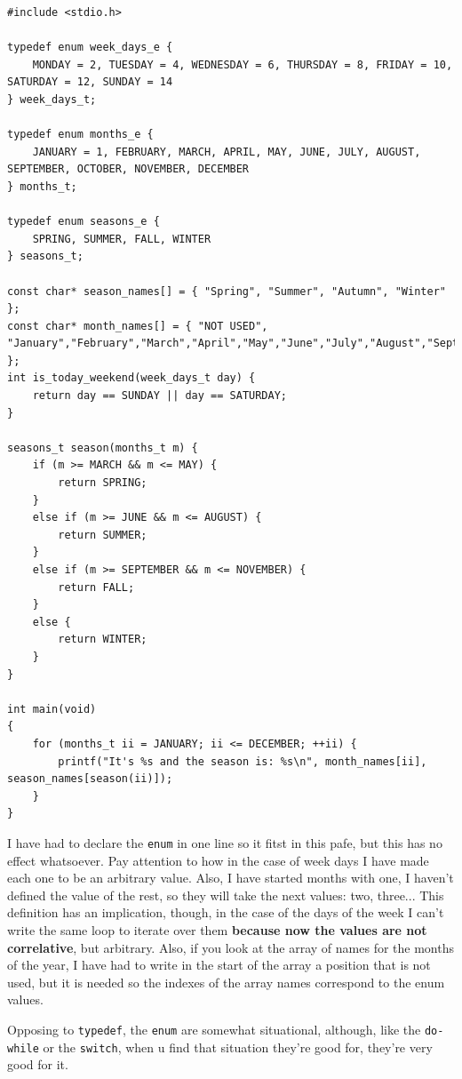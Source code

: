 \documentclass[a4paper]{article}
\begin{document}
\noindent
\begin{minipage}[H]{\linewidth}
\mbox{}
\begin{lstlisting}[style=C,
caption={Final example of the enumerated types},
label={lst:finalEnums}]
#include <stdio.h>

typedef enum week_days_e {
    MONDAY = 2, TUESDAY = 4, WEDNESDAY = 6, THURSDAY = 8, FRIDAY = 10, SATURDAY = 12, SUNDAY = 14
} week_days_t;

typedef enum months_e {
    JANUARY = 1, FEBRUARY, MARCH, APRIL, MAY, JUNE, JULY, AUGUST, SEPTEMBER, OCTOBER, NOVEMBER, DECEMBER
} months_t;

typedef enum seasons_e {
    SPRING, SUMMER, FALL, WINTER
} seasons_t;

const char* season_names[] = { "Spring", "Summer", "Autumn", "Winter" };
const char* month_names[] = { "NOT USED", "January","February","March","April","May","June","July","August","September","October","November","December" };
int is_today_weekend(week_days_t day) {
    return day == SUNDAY || day == SATURDAY;
}

seasons_t season(months_t m) {
    if (m >= MARCH && m <= MAY) {
        return SPRING;
    }
    else if (m >= JUNE && m <= AUGUST) {
        return SUMMER;
    }
    else if (m >= SEPTEMBER && m <= NOVEMBER) {
        return FALL;
    }
    else {
        return WINTER;
    }
}

int main(void)
{
    for (months_t ii = JANUARY; ii <= DECEMBER; ++ii) {
        printf("It's %s and the season is: %s\n", month_names[ii], season_names[season(ii)]);
    }
}
\end{lstlisting}
\end{minipage}

I have had to declare the \verb!enum! in one line so it fitst in this pafe, but
this has no effect whatsoever. Pay attention to how in the case of week days I
have made each one to be an arbitrary value. Also, I have started months with
one, I haven't defined the value of the rest, so they will take the next values:
two, three... This definition has an implication, though, in the case of the
days of the week I can't write the same loop to iterate over them
\textbf{because now the values are not correlative}, but arbitrary. Also, if you
look at the array of names for the months of the year, I have had to write in
the start of the array a position that is not used, but it is needed so the
indexes of the array names correspond to the enum values.

Opposing to \verb!typedef!, the \verb!enum! are somewhat situational, although,
like the \verb!do-while! or the \verb!switch!, when u find that situation
they're good for, they're very good for it.
\end{document}
